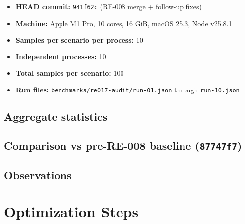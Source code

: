 \begin{itemize}
\tightlist
\item
  \textbf{HEAD commit:} \texttt{9\allowbreak{}4\allowbreak{}1\allowbreak{}f\allowbreak{}6\allowbreak{}2\allowbreak{}c} (RE-008 merge + follow-up fixes)
\item
  \textbf{Machine:} Apple M1 Pro, 10 cores, 16 GiB, macOS 25.3, Node v25.8.1
\item
  \textbf{Samples per scenario per process:} 10
\item
  \textbf{Independent processes:} 10
\item
  \textbf{Total samples per scenario:} 100
\item
  \textbf{Run files:} \texttt{b\allowbreak{}e\allowbreak{}n\allowbreak{}c\allowbreak{}h\allowbreak{}m\allowbreak{}a\allowbreak{}r\allowbreak{}k\allowbreak{}s\allowbreak{}/\allowbreak{}r\allowbreak{}e\allowbreak{}0\allowbreak{}1\allowbreak{}7\allowbreak{}-\allowbreak{}a\allowbreak{}u\allowbreak{}d\allowbreak{}i\allowbreak{}t\allowbreak{}/\allowbreak{}r\allowbreak{}u\allowbreak{}n\allowbreak{}-\allowbreak{}0\allowbreak{}1\allowbreak{}.\allowbreak{}j\allowbreak{}s\allowbreak{}o\allowbreak{}n} through \texttt{r\allowbreak{}u\allowbreak{}n\allowbreak{}-\allowbreak{}1\allowbreak{}0\allowbreak{}.\allowbreak{}j\allowbreak{}s\allowbreak{}o\allowbreak{}n}
\end{itemize}

\subsection{Aggregate statistics}\label{record-422-aggregate-statistics}

\subsection{\texorpdfstring{Comparison vs pre-RE-008 baseline (\texttt{8\allowbreak{}7\allowbreak{}7\allowbreak{}4\allowbreak{}7\allowbreak{}f\allowbreak{}7})}{Comparison vs pre-RE-008 baseline ()}}\label{record-422-comparison-vs-pre-re-008-baseline-87747f7}

\subsection{Observations}\label{record-422-observations}

\section{Optimization Steps}\label{record-422-optimization-steps}

